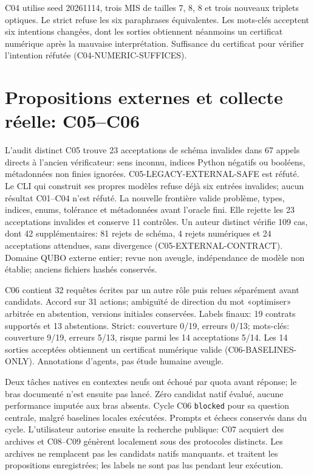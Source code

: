 \documentclass{article}
\begin{document}
C04 utilise seed 20261114, trois MIS de tailles 7, 8, 8 et trois nouveaux
triplets optiques. Le strict refuse les six paraphrases équivalentes.
Les mots-clés acceptent six intentions changées, dont les sorties obtiennent
néanmoins un certificat numérique après la mauvaise interprétation.
Suffisance du certificat pour vérifier l'intention réfutée
(C04-NUMERIC-SUFFICES).

\section{Propositions externes et collecte réelle: C05--C06}
L'audit distinct C05 trouve 23 acceptations de schéma invalides dans
67 appels directs à l'ancien vérificateur: sens inconnu, indices Python
négatifs ou booléens, métadonnées non finies ignorées.
C05-LEGACY-EXTERNAL-SAFE est réfuté. Le CLI qui construit ses propres modèles
refuse déjà six entrées invalides; aucun résultat C01--C04 n'est réfuté.
La nouvelle frontière  valide problème, types,
indices, enums, tolérance et métadonnées avant l'oracle fini. Elle rejette
les 23 acceptations invalides et conserve 11 contrôles.
Un auteur distinct vérifie 109 cas, dont 42 supplémentaires: 81 rejets de
schéma, 4 rejets numériques et 24 acceptations attendues, sans divergence
(C05-EXTERNAL-CONTRACT). Domaine QUBO externe entier; revue non aveugle,
indépendance de modèle non établie; anciens fichiers hashés conservés.

C06 contient 32 requêtes écrites par un autre rôle puis relues séparément
avant candidats. Accord sur 31 actions; ambiguïté de direction du mot
«optimiser» arbitrée en abstention, versions initiales conservées.
Labels finaux: 19 contrats supportés et 13 abstentions.
Strict: couverture 0/19, erreurs 0/13; mots-clés: couverture 9/19,
erreurs 5/13, risque parmi les 14 acceptations 5/14.
Les 14 sorties acceptées obtiennent un certificat numérique valide
(C06-BASELINES-ONLY). Annotations d'agents, pas étude humaine aveugle.

Deux tâches natives en contextes neufs ont échoué par quota avant réponse;
le bras documenté n'est ensuite pas lancé. Zéro candidat natif évalué,
aucune performance imputée aux bras absents. Cycle C06 \texttt{blocked}
pour sa question centrale, malgré baselines locales exécutées.
Prompts et échecs conservés dans  du cycle.
L'utilisateur autorise ensuite la recherche publique: C07 acquiert des archives
et C08--C09 génèrent localement sous des protocoles distincts. Les archives ne
remplacent pas les candidats natifs manquants. 
et  traitent les propositions enregistrées;
les labels ne sont pas lus pendant leur exécution.
\end{document}
